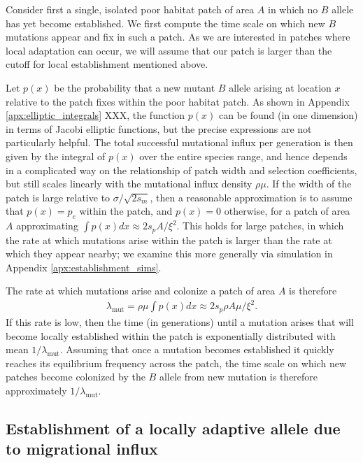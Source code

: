 \documentclass{article}
\newcommand{\mutrate}{\lambda_\text{mut}}
\begin{document}
Consider first a single, isolated poor habitat patch of area $A$ in which no $B$ allele has yet become established. 
We first compute the time scale on which new $B$ mutations appear and fix in such a patch.
As we are interested in patches where local adaptation can occur,
we will assume that our patch is larger than the cutoff for local establishment 
mentioned above.

Let $p(x)$ be the probability that a new mutant $B$ allele arising at location $x$ 
relative to the patch fixes within the poor habitat patch.
As shown in Appendix \ref{apx:elliptic_integrals} XXX,
the function $p(x)$ can be found (in one dimension) in terms of Jacobi elliptic functions,
but the precise expressions are not particularly helpful.
The total successful mutational influx per generation is then given by the integral of $p(x)$ over the entire species range,
and hence depends in a complicated way on the relationship of patch width and selection coefficients,
but still scales linearly with the mutational influx density $\rho \mu$.
If the width of the patch is large relative to $\sigma/\sqrt{2s_m}$, 
then a reasonable approximation is to assume that $p(x) = p_e$ within the patch, and $p(x) = 0$ otherwise,
for a patch of area $A$ approximating $\int p(x) dx \approx 2 s_p A / \xi^2$. 
This holds for large patches, in which the rate at which mutations arise within the patch is larger 
than the rate at which they appear nearby;
we examine this more generally via simulation in Appendix \ref{apx:establishment_sims}.

The rate at which mutations arise and colonize a patch of area $A$ is therefore
\begin{align} \label{eqn:mutrate}
  \mutrate = \rho \mu \int p(x) dx  \approx 2 s_p \rho A \mu / \xi^2.
\end{align}
If this rate is low, then the time (in generations) until a mutation arises that
will become locally established within the patch is exponentially distributed with mean $1/\mutrate$.  
Assuming that once a mutation becomes established it quickly reaches its equilibrium frequency across the patch, 
the time scale on which new patches become colonized by the $B$ allele from new mutation is therefore approximately $1/\mutrate$.


\subsection{Establishment of a locally adaptive allele due to migrational influx}
\label{ss:patchymigration}
\end{document}

